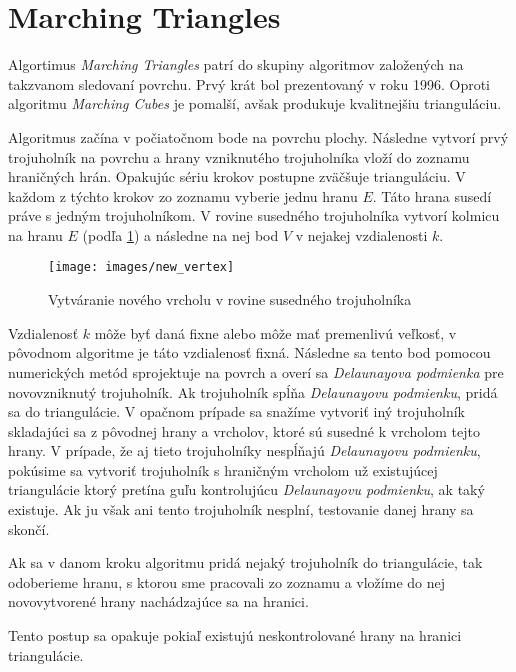 \section{Marching Triangles}

Algortimus \textit{Marching Triangles} \cite{hilton1996marching} patrí do skupiny algoritmov založených na takzvanom 
sledovaní povrchu. Prvý krát bol prezentovaný v roku 1996. Oproti algoritmu \textit{Marching Cubes} je pomalší, avšak
produkuje kvalitnejšiu trianguláciu. 

Algoritmus začína v počiatočnom bode na povrchu plochy. Následne vytvorí prvý trojuholník na povrchu a hrany vzniknutého 
trojuholníka vloží do zoznamu hraničných hrán. 
Opakujúc sériu krokov postupne zväčšuje trianguláciu. V každom z týchto krokov zo zoznamu vyberie jednu hranu $E$. 
Táto hrana susedí práve s jedným trojuholníkom. V rovine susedného trojuholníka vytvorí kolmicu na hranu $E$
(podľa \ref{obr:new_vertex}) a následne na nej bod $V$ v nejakej vzdialenosti $k$. 

\begin{figure}
    \centerline{\texttt{[image: images/new\_vertex]}}
    \caption[Vytváranie nového vrcholu $V$ v rovine susedného trojuholníka]{Vytváranie nového vrcholu v rovine susedného trojuholníka}
    \label{obr:new_vertex}
\end{figure}

Vzdialenosť $k$ môže byť daná fixne alebo môže mať premenlivú veľkosť, v pôvodnom algoritme je táto vzdialenosť fixná. 
Následne sa tento bod pomocou numerických metód sprojektuje na povrch a overí sa \textit{Delaunayova podmienka} pre novovzniknutý 
trojuholník. 
Ak trojuholník spĺňa \textit{Delaunayovu podmienku}, pridá sa do triangulácie. V opačnom prípade sa snažíme vytvoriť iný trojuholník 
skladajúci sa z pôvodnej hrany a vrcholov, ktoré sú susedné k vrcholom tejto hrany. V prípade, že aj tieto trojuholníky nespĺňajú 
\textit{Delaunayovu podmienku}, pokúsime sa vytvoriť trojuholník s hraničným vrcholom už existujúcej triangulácie ktorý pretína
guľu kontrolujúcu \textit{Delaunayovu podmienku}, ak taký existuje. Ak ju však ani tento trojuholník nesplní, testovanie danej hrany sa skončí.

Ak sa v danom kroku algoritmu pridá nejaký trojuholník do triangulácie, tak odoberieme hranu, s ktorou sme pracovali zo zoznamu a 
vložíme do nej novovytvorené hrany nachádzajúce sa na hranici.

Tento postup sa opakuje pokiaľ existujú neskontrolované hrany na hranici triangulácie.

